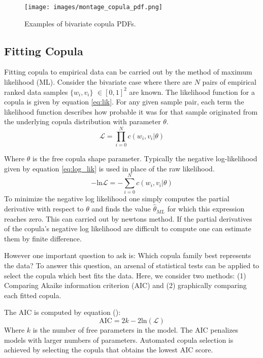 \begin{figure}[!htbp]
\centering
\texttt{[image: images/montage\_copula\_pdf.png]}
\caption{Examples of bivariate copula PDFs.}
\label{fig:montage_cop}
\end{figure}

\subsection*{Fitting Copula}

Fitting copula to empirical data can be carried out by the method of maximum likelihood (ML).  Consider the bivariate case where there are $N$ pairs of empirical ranked data samples $\{w_i, v_i\}$ $\in [0,1]^2$ are known. The likelihood function for a copula is given by equation \ref{eq:lik}.  For any given sample pair, each term the likelihood function describes how probable it was for that sample originated from the underlying copula distribution with parameter $\theta$.
\begin{equation}
\mathcal{L}= \prod_{i=0}^N c(w_i, v_i|\theta)
\label{eq:lik}
\end{equation}

Where $\theta$ is the free copula shape parameter.
Typically the negative log-likelihood given by equation \ref{eq:log_lik} is used in place of the raw likelihood.  
\begin{equation}
-\mathrm{ln}\mathcal{L}= -\sum_{i=0}^N c(w_i, v_i|\theta)
\label{eq:log_lik}
\end{equation}
To minimize the negative log likelihood one simply computes the partial derivative with respect to $\theta$ and finds the value $\hat \theta_{ML}$ for which this expression reaches zero.  This can carried out by newtons method.  If the partial derivatives of the copula's negative log likelihood are difficult to compute one can estimate them by finite difference. 

However one important question to ask is: Which copula family best represents the data?  To answer this question, an arsenal of statistical tests can be applied to select the copula which best fits the data.  Here, we consider two methods:  (1) Comparing Akaike information criterion (AIC) and (2) graphically comparing each fitted copula.  

The AIC is computed by equation ():
\begin{equation}
\mathrm{AIC} = 2k - 2\mathrm{ln}(\mathcal{L})
\end{equation}
Where $k$ is the number of free parameters in the model.  The AIC penalizes models with larger numbers of parameters. 
Automated copula selection is achieved by selecting the copula that obtains the lowest AIC score.

